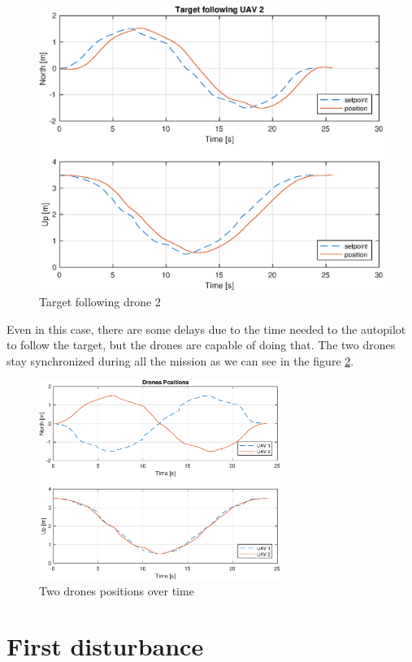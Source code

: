 \begin{figure}
\centering
\includegraphics[width=0.7\linewidth]{chapters/chapter-05/figures/following_2.eps}
\caption{Target following drone 2}
\label{fig:exp_following_2}
\end{figure}

Even in this case, there are some delays due to the time needed to the autopilot to follow
the target, but the drones are capable of doing that.
The two drones stay synchronized during all the mission as we can see in the figure
\ref{fig:exp_overlapped}.

\begin{figure}
\centering
\includegraphics[width=0.7\textwidth]{chapters/chapter-05/figures/overlapped.eps}
\caption{Two drones positions over time}
\label{fig:exp_overlapped}
\end{figure}


\section{First disturbance}

